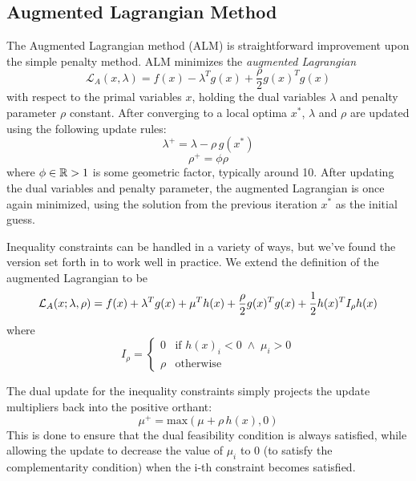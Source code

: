\documentclass[../root.tex]{subfiles}
\begin{document}
\subsection{Augmented Lagrangian Method} \label{sec:background_alm}
    The Augmented Lagrangian method (ALM) is straightforward improvement upon the 
    simple penalty method. ALM minimizes the \textit{augmented Lagrangian}
    \begin{equation}
        \mathcal{L}_A(x, \lambda) = f(x) - \lambda^T g(x) + \frac{\rho}{2} g(x)^T g(x)
    \end{equation}
    with respect to the primal variables $x$, holding the dual variables $\lambda$ and 
    penalty parameter $\rho$ constant. After converging to a local optima $x^*$, 
    $\lambda$ and $\rho$ are updated using the following update rules:
    \begin{equation} \label{eq:al_dual_update}
        \lambda^+ = \lambda - \rho \, g(x^*)
    \end{equation}
    \begin{equation}
        \rho^+ = \phi \rho
    \end{equation}
    where $\phi \in \mathbb{R} > 1$ is some geometric factor, typically around 10. After updating 
    the dual variables and penalty parameter, the augmented Lagrangian is once again 
    minimized, using the solution from the previous iteration $x^*$ as the initial guess.

    Inequality constraints can be handled in a variety of ways, but we've found
    the version set forth in \cite{toussaint_Novel_2014} to work
    well in practice. We extend the definition of the augmented Lagrangian to be
    \begin{equation}
        \mathcal L_A(x; \lambda, \rho) = f(x) + \lambda^T g(x) + \mu^T h(x) 
            + \frac{\rho}{2} g(x)^T g(x) + \frac{1}{2} h(x)^T I_\rho h(x)
    \end{equation}
    where 
    \begin{equation} \label{eq:penalty_matrix}
        I_\rho = \begin{cases}
            0 & \text{if } h(x)_i < 0 \; \wedge \; \mu_i > 0 \\
            \rho & \text{otherwise}
        \end{cases}
    \end{equation}

    The dual update for the inequality constraints simply projects the update multipliers 
    back into the positive orthant:
    \begin{equation}
        \mu^+ = \text{max}(\mu + \rho \, h(x), 0)
    \end{equation}
    This is done to ensure that the dual feasibility condition is always
    satisfied, while allowing the update to decrease the value of $\mu_i$ to 0
    (to satisfy the complementarity condition) when the i-th constraint becomes
    satisfied.
\end{document}
